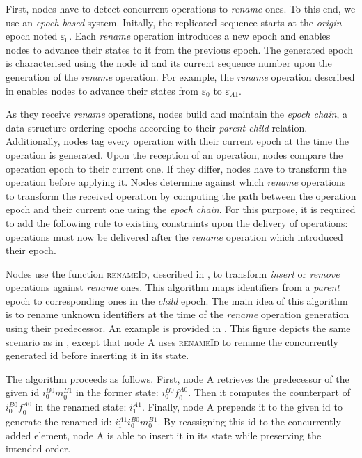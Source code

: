 \documentclass[10pt,journal,compsoc]{IEEEtran}
\newcommand{\trm}[1]{\mathit{#1}}
\newcommand{\id}[3]{$\trm{#1}^{\trm{#2}}_{\trm{#3}}$}
\newcommand{\epoch}[1]{$\varepsilon_{#1}$}
\begin{document}
First, nodes have to detect concurrent operations to \emph{rename} ones.
To this end, we use an \emph{epoch-based} system.
Initally, the replicated sequence starts at the \emph{origin} epoch noted \epoch{0}.
Each \emph{rename} operation introduces a new epoch and enables nodes to advance their states to it from the previous epoch.
The generated epoch is characterised using the node id and its current sequence number upon the generation of the \emph{rename} operation.
For example, the \emph{rename} operation described in  enables nodes to advance their states from \epoch{0} to \epoch{A1}.

As they receive \emph{rename} operations, nodes build and maintain the \emph{epoch chain}, a data structure ordering epochs according to their \emph{parent-child} relation.
Additionally, nodes tag every operation with their current epoch at the time the operation is generated.
Upon the reception of an operation, nodes compare the operation epoch to their current one.
If they differ, nodes have to transform the operation before applying it.
Nodes determine against which \emph{rename} operations to transform the received operation by computing the path between the operation epoch and their current one using the \emph{epoch chain}.
For this purpose, it is required to add the following rule to existing constraints upon the delivery of operations: operations must now be delivered after the \emph{rename} operation which introduced their epoch.

Nodes use the function \textsc{renameId}, described in , to transform \emph{insert} or \emph{remove} operations against \emph{rename} ones.
This algorithm maps identifiers from a \emph{parent} epoch to corresponding ones in the \emph{child} epoch.
The main idea of this algorithm is to rename unknown identifiers at the time of the \emph{rename} operation generation using their predecessor.
An example is provided in .
This figure depicts the same scenario as in , except that node A uses \textsc{renameId} to rename the concurrently generated id before inserting it in its state.

The algorithm proceeds as follows.
First, node A retrieves the predecessor of the given id \id{i}{B0}{0}\id{m}{B1}{0} in the former state: \id{i}{B0}{0}\id{f}{A0}{0}.
Then it computes the counterpart of \id{i}{B0}{0}\id{f}{A0}{0} in the renamed state: \id{i}{A1}{1}.
Finally, node A prepends it to the given id to generate the renamed id: \id{i}{A1}{1}\id{i}{B0}{0}\id{m}{B1}{0}.
By reassigning this id to the concurrently added element, node A is able to insert it in its state while preserving the intended order.
\end{document}
